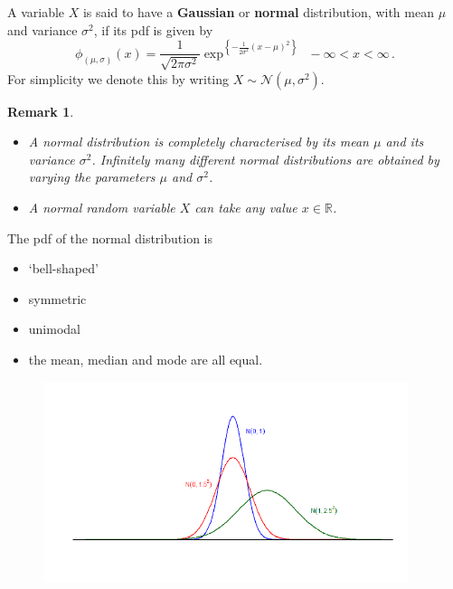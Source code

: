 \documentclass[notes=show,smaller,handout]{beamer}\usepackage[]{graphicx}\usepackage[]{color}
\newtheorem{remark}{Remark}[section]
\newcommand{\N}{\mathcal{N}}
\newenvironment{stepitemize}{\begin{itemize}[<+->]}{\end{itemize} }
\begin{document}
\begin{frame}{\subsecname}

  \begin{definition}
  A variable $X$ is said to have a \textbf{Gaussian} or \textbf{normal}
  distribution, with mean $\mu $ and variance $\sigma ^{2}$, if its pdf is given by
  \begin{equation*}
  \phi_{(\mu,\sigma)}(x) =\frac{1}{\sqrt{2\pi \sigma ^{2}}}\exp^{ \left\{ -\frac{1%
  }{2\sigma ^{2}}\left( x-\mu \right) ^{2}\right\}}~~-\infty<x<\infty\,.
  \end{equation*}
  For simplicity we denote this by writing $X\sim \N\left( \mu ,\sigma ^{2}\right) $.
  \end{definition}
  \pause
  \begin{remark}
  \begin{itemize}
  \item A normal distribution is completely characterised by its mean $\mu $ and its variance $\sigma ^{2}$. Infinitely many different normal distributions are obtained by varying the parameters $\mu $ and $\sigma ^{2}$.
  \item A normal random variable $X$ can take any value $x\in\mathbb{R}$.
  \end{itemize}
  \end{remark}
\end{frame}

\begin{frame}{\subsecname}
  The pdf of the normal distribution is
  \begin{stepitemize}
  \item `bell-shaped'
  \item symmetric
  \item unimodal
  \item the mean, median and mode are all equal.
  \end{stepitemize}
  \begin{figure}[ptb]\centering
  \includegraphics[width=0.95\textwidth,height=0.75\textheight]{img/normals4.pdf}%
  \end{figure}
\end{frame}
\end{document}
